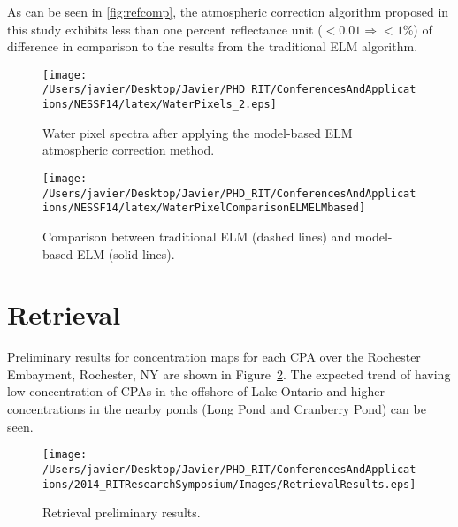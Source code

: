 As can be seen in \autoref{fig:refcomp}, the atmospheric correction algorithm proposed in this study exhibits less than one percent reflectance unit ($<0.01\Rightarrow <1\%$) of difference in comparison to the results from the traditional ELM algorithm.

\begin{figure}[htb]
  \begin{minipage}[c]{0.48\linewidth}
    \centering
      \texttt{[image: /Users/javier/Desktop/Javier/PHD\_RIT/ConferencesAndApplications/NESSF14/latex/WaterPixels\_2.eps]}
      \caption{Water pixel spectra after applying the model-based ELM atmospheric correction method.}
      \label{fig:waterpxs}
  \end{minipage}
  \hfill
  \begin{minipage}[d]{0.48\linewidth}
    \centering
      \texttt{[image: /Users/javier/Desktop/Javier/PHD\_RIT/ConferencesAndApplications/NESSF14/latex/WaterPixelComparisonELMELMbased]}
      \caption{Comparison between traditional ELM (dashed lines) and model-based ELM (solid lines).}
      \label{fig:refcomp}
  \end{minipage}
\end{figure}


\section{Retrieval}

Preliminary results for concentration maps for each CPA over the Rochester Embayment, Rochester, NY are shown in Figure~\ref{fig:retrievalresults}. The expected trend of having low concentration of CPAs in the offshore of Lake Ontario and higher concentrations in the nearby ponds (Long Pond and Cranberry Pond) can be seen. 
\begin{figure}[htb]
\centering
\texttt{[image: /Users/javier/Desktop/Javier/PHD\_RIT/ConferencesAndApplications/2014\_RITResearchSymposium/Images/RetrievalResults.eps]}
   \caption{Retrieval preliminary results.}
      \label{fig:retrievalresults}   
\end{figure}

